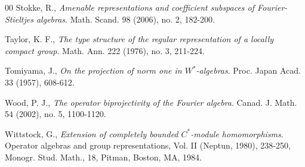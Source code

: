 \documentclass[preprint,12pt]{elsarticle}
\newcommand{\e}[1]{\emph{#1}}
\begin{document}
\begin{thebibliography}{00}
 Stokke, R.,
\e{Amenable representations and coefficient subspaces of Fourier-Stieltjes algebras}.
Math. Scand. 98 (2006), no. 2, 182-200.


 Taylor, K. F.,
\e{The type structure of the regular representation of a locally compact group}.
Math. Ann. 222 (1976), no. 3, 211-224.


 Tomiyama, J.,
\e{On the projection of norm one in $W^*$-algebras}.
Proc. Japan Acad. 33 (1957), 608-612.


 Wood, P. J.,
\e{The operator biprojectivity of the Fourier algebra}.
Canad. J. Math. 54 (2002), no. 5, 1100-1120.


 Wittstock, G.,
\e{Extension of completely bounded $C^*$-module homomorphisms}.
Operator algebras and group representations, Vol. II (Neptun, 1980), 238-250,
Monogr. Stud. Math., 18, Pitman, Boston, MA, 1984.




\end{thebibliography}
\end{document}
